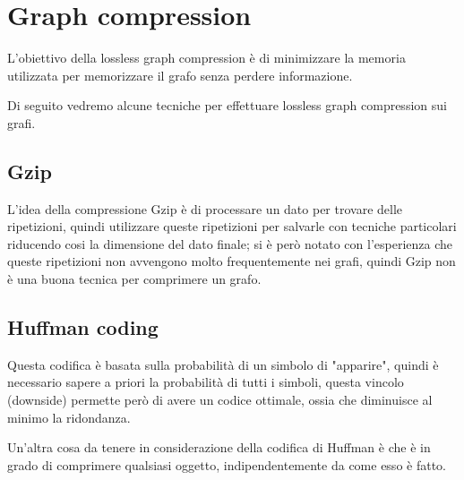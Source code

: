 \documentclass[12pt,a4paper]{article}
\begin{document}
\section{Graph compression}
L'obiettivo della lossless graph compression è di minimizzare la memoria utilizzata per memorizzare il grafo senza perdere informazione.

Di seguito vedremo alcune tecniche per effettuare lossless graph compression sui grafi.

\subsection{Gzip}
L'idea della compressione Gzip è di processare un dato per trovare delle ripetizioni, quindi utilizzare queste ripetizioni per salvarle con tecniche particolari riducendo cosi la dimensione del dato finale; si è però notato con l'esperienza che queste ripetizioni non avvengono molto frequentemente nei grafi, quindi Gzip non è una buona tecnica per comprimere un grafo.

\subsection{Huffman coding}
Questa codifica è basata sulla probabilità di un simbolo di "apparire", quindi è necessario sapere a priori la probabilità di tutti i simboli, questa vincolo (downside) permette però di avere un codice ottimale, ossia che diminuisce al minimo la ridondanza.

Un'altra cosa da tenere in considerazione della codifica di Huffman è che è in grado di comprimere qualsiasi oggetto, indipendentemente da come esso è fatto.
\end{document}
